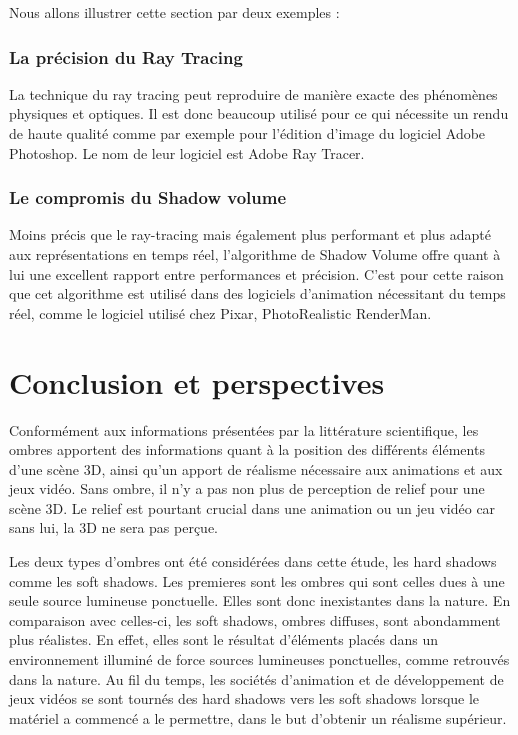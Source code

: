 \documentclass[a4paper,12pt]{report}
\begin{document}
Nous allons illustrer cette section par deux exemples :

\subsection{La précision du Ray Tracing}

La technique du ray tracing peut reproduire de manière exacte des phénomènes physiques et optiques. Il est donc beaucoup utilisé pour ce qui nécessite un rendu de haute qualité comme par exemple pour l'édition d'image du logiciel Adobe Photoshop. Le nom de leur logiciel est Adobe Ray Tracer.
\subsection{Le compromis du Shadow volume}

Moins précis que le ray-tracing mais également plus performant et plus adapté aux représentations en temps réel, l'algorithme de Shadow Volume offre quant à lui une excellent rapport entre performances et précision. C'est pour cette raison que cet algorithme est utilisé dans des logiciels d'animation nécessitant du temps réel, comme le logiciel utilisé chez Pixar, PhotoRealistic RenderMan.


\chapter{Conclusion et perspectives}

Conformément aux informations présentées par la littérature scientifique, les ombres apportent des informations quant à la position des différents éléments d'une scène 3D, ainsi qu'un apport de réalisme nécessaire aux animations et aux jeux vidéo. Sans ombre, il n'y a pas non plus de perception de relief pour une scène 3D. Le relief est pourtant crucial dans une animation ou un jeu vidéo car sans lui, la 3D ne sera pas perçue. 


Les deux types d'ombres ont été considérées dans cette étude, les hard shadows comme les soft shadows. Les premieres sont les ombres qui sont celles dues à une seule source lumineuse ponctuelle. Elles sont donc inexistantes dans la nature. En comparaison avec celles-ci, les soft shadows, ombres diffuses, sont abondamment plus réalistes. En effet, elles sont le résultat d'éléments placés dans un environnement illuminé de force sources lumineuses ponctuelles, comme retrouvés dans la nature.
Au fil du temps, les sociétés d'animation et de développement de jeux vidéos se sont tournés des hard shadows vers les soft shadows lorsque le matériel a commencé a le permettre, dans le but d'obtenir un réalisme supérieur.
\end{document}
